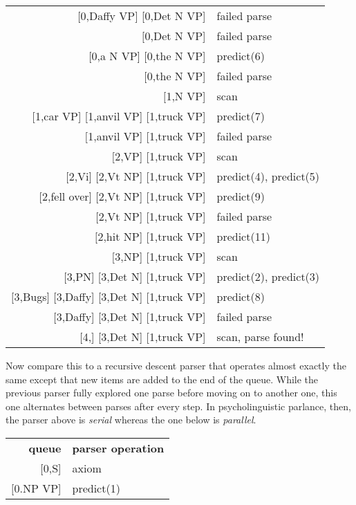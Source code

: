 \begin{examplebox}
\begin{center}
\begin{tabular}{r|l}
            $\lbrack$0,Daffy VP] [0,Det N VP] & failed parse\\
            $\lbrack$0,Det N VP] & failed parse\\
            $\lbrack$0,a N VP] [0,the N VP] & predict(6)\\
            $\lbrack$0,the N VP] & failed parse\\
            $\lbrack$1,N VP] & scan\\
            $\lbrack$1,car VP] [1,anvil VP] [1,truck VP]& predict(7)\\
            $\lbrack$1,anvil VP] [1,truck VP] & failed parse\\
            $\lbrack$2,VP] [1,truck VP] & scan\\
            $\lbrack$2,Vi] [2,Vt NP] [1,truck VP] & predict(4), predict(5)\\
            $\lbrack$2,fell over] [2,Vt NP] [1,truck VP] & predict(9)\\
            $\lbrack$2,Vt NP] [1,truck VP] & failed parse\\
            $\lbrack$2,hit NP] [1,truck VP] & predict(11)\\
            $\lbrack$3,NP] [1,truck VP] & scan\\
            $\lbrack$3,PN] [3,Det N] [1,truck VP] & predict(2), predict(3)\\
            $\lbrack$3,Bugs] [3,Daffy] [3,Det N] [1,truck VP] & predict(8)\\
            $\lbrack$3,Daffy] [3,Det N] [1,truck VP] & failed parse\\
            $\lbrack$4,] [3,Det N] [1,truck VP] & scan, parse found!
        \end{tabular}
    \end{center}
    Now compare this to a recursive descent parser that operates almost exactly the same except that new items are added to the end of the queue.
    While the previous parser fully explored one parse before moving on to another one, this one alternates between parses after every step.
    In psycholinguistic parlance, then, the parser above is \emph{serial} whereas the one below is \emph{parallel}.
    \begin{center}
        \begin{tabular}{r|l}
            \textbf{queue} & \textbf{parser operation}\\
            $\lbrack$0,S] & axiom\\
            $\lbrack$0.NP VP] & predict(1)\\

\end{tabular}
\end{center}
\end{examplebox}
